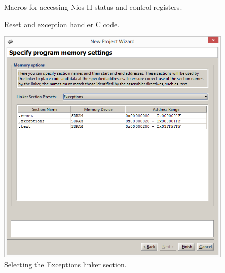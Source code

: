 \documentclass[epsfig,10pt,fullpage]{article}
\begin{document}
\newpage
\begin{figure}[h!]
\begin{center}

\end{center}
	\vspace{-0.5cm}\caption{Macros for accessing Nios II status and control registers.}
   \label{fig:macros}
\end{figure}

\newpage




\begin{figure}[H]
\begin{center}

\end{center}
\vspace{-0.5cm}\caption{Reset and exception handler C code.}
\end{figure}

\begin{figure}[H]
	\begin{center}
	\includegraphics[scale=0.58]{figures/exceptions.png}
	\end{center}
	\vspace{-0.25cm}\caption{Selecting the {\sf Exceptions} linker section.}
\label{fig:exceptions}
\end{figure}
\end{document}
